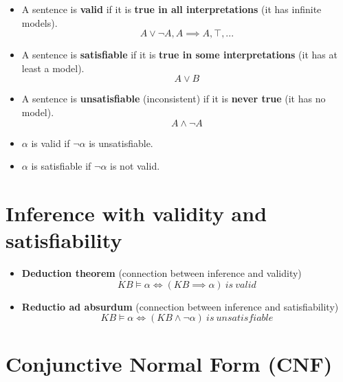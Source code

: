 \documentclass{article}
\begin{document}
\begin{itemize}
    \item A sentence is \textbf{valid} if it is \textbf{true in all interpretations} (it has infinite models).
    \begin{equation*}
        A \lor \neg A, A \implies A, \top, ...
    \end{equation*}
    \item A sentence is \textbf{satisfiable} if it is \textbf{true in some interpretations} (it has at least a model).
    \begin{equation*}
        A \lor B
    \end{equation*}
    \item A sentence is \textbf{unsatisfiable} (inconsistent) if it is \textbf{never true} (it has no model).
    \begin{equation*}
        A \land \neg A        
    \end{equation*}
    \item $\alpha$ is valid if $\neg \alpha$ is unsatisfiable.
    \item $\alpha$ is satisfiable if $\neg \alpha$ is not valid.
\end{itemize}

\newpage

\section*{Inference with validity and satisfiability}

\begin{itemize}
    \item \textbf{Deduction theorem} (connection between inference and validity)
    \begin{equation*}
        KB \models \alpha \iff (KB \implies \alpha)\ is\ valid
    \end{equation*}
    \item \textbf{Reductio ad absurdum} (connection between inference and satisfiability)
    \begin{equation*}
        KB \models \alpha \iff (KB \land \neg \alpha)\ is\ unsatisfiable
    \end{equation*}
\end{itemize}

\newpage

\section{Conjunctive Normal Form (CNF)}
\end{document}
